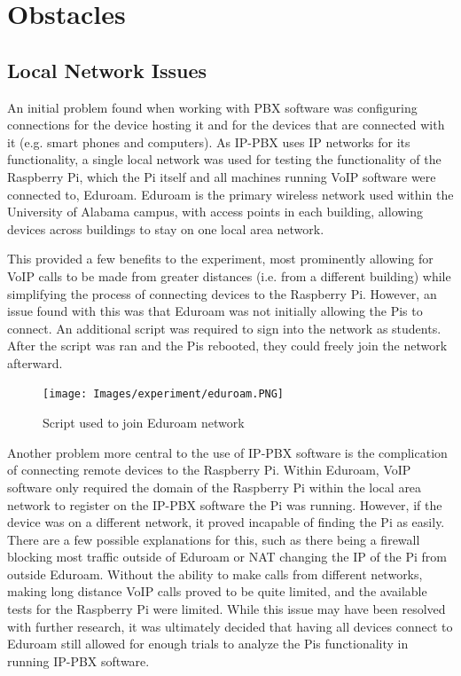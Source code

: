 \section{Obstacles} \label{sec:obstacles}
    \subsection{Local Network Issues}
        An initial problem found when working with PBX software was configuring connections for the device hosting it and for the devices that are connected with it (e.g. smart phones and computers). As IP-PBX uses IP networks for its functionality, a single local network was used for testing the functionality of the Raspberry Pi, which the Pi itself and all machines running VoIP software were connected to, Eduroam. Eduroam is the primary wireless network used within the University of Alabama campus, with access points in each building, allowing devices across buildings to stay on one local area network. 
        
        This provided a few benefits to the experiment, most prominently allowing for VoIP calls to be made from greater distances (i.e. from a different building) while simplifying the process of connecting devices to the Raspberry Pi. However, an issue found with this was that Eduroam was not initially allowing the Pis to connect. An additional script was required to sign into the network as students. After the script was ran and the Pis rebooted, they could freely join the network afterward.
        
        \begin{figure}[htbp]
			\centerline{\texttt{[image: Images/experiment/eduroam.PNG]}}
			\caption{Script used to join Eduroam network}
			\label{fig:edu-script}
		\end{figure}
		
		Another problem more central to the use of IP-PBX software is the complication of connecting remote devices to the Raspberry Pi. Within Eduroam, VoIP software only required the domain of the Raspberry Pi within the local area network to register on the IP-PBX software the Pi was running. However, if the device was on a different network, it proved incapable of finding the Pi as easily. There are a few possible explanations for this, such as there being a firewall blocking most traffic outside of Eduroam or NAT changing the IP of the Pi from outside Eduroam. Without the ability to make calls from different networks, making long distance VoIP calls proved to be quite limited, and the available tests for the Raspberry Pi were limited. While this issue may have been resolved with further research, it was ultimately decided that having all devices connect to Eduroam still allowed for enough trials to analyze the Pis functionality in running IP-PBX software.
		
